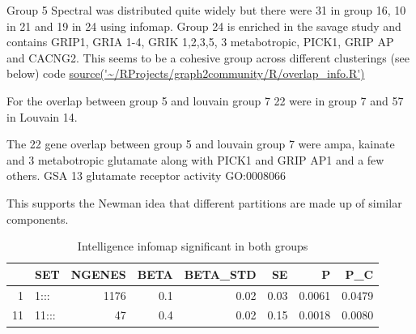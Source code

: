 Group 5 Spectral was distributed quite widely but there were 31 in group 16, 10 in 21 and 19 in 24 using infomap. Group 24 is enriched in the savage study and contains GRIP1, GRIA 1-4, GRIK 1,2,3,5, 3 metabotropic, PICK1, GRIP AP and CACNG2. This seems to be a cohesive group across different clusterings (see below) code \url{source('~/RProjects/graph2community/R/overlap_info.R')}


For the overlap between group 5 
and louvain group 7 22 were in group 7 and 57 in Louvain 14.

The 22 gene overlap between group 5 and louvain group 7 were ampa, kainate and 3 metabotropic glutamate along with PICK1 and GRIP AP1 and a few others. GSA 13 glutamate receptor activity GO:0008066 

This supports the Newman idea that different partitions are made up of similar components. 





\begin{table}[ht]
\centering
\begin{tabular}{rlrrrrrr}
  \hline
 & SET & NGENES & BETA & BETA\_STD & SE & P & P\_C \\ 
  \hline
1 & 1::: & 1176 & 0.1 & 0.02 & 0.03 & 0.0061 & 0.0479 \\ 
  11 & 11::: & 47 & 0.4 & 0.02 & 0.15 & 0.0018 & 0.0080 \\ 
   \hline
\end{tabular}
\caption{Intelligence infomap significant in both groups}
\label{tab:Infomap Intelligence infomap significant in both groups}
\end{table}

